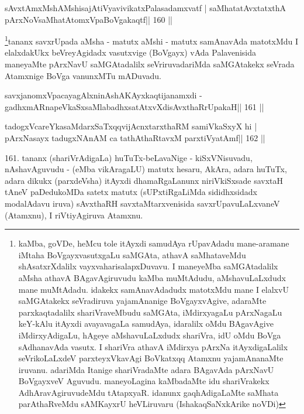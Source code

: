 
\begin{shl}
sAvxtAmxMshAMshisajAtiVyavivikatxPalasadamxvatf |
saMhatatAvxtatxthA pArxNoV\s saMhatAtomxVpaBoVgakaqtf\hfill || 160 ||
\end{shl}

\begin{artha}
\footnote{kaMba, goVDe, heMcu tole itAyxdi samudAya rUpavAdadu 
mane-aramane iMtaha BoVgayxvasutxgaLu saMGAta, athavA saMhataveMdu 
shAsatxrXdalilx vayxvaharisalapxDuvavu. I maneyeMba saMGAtadalilx aMsha 
athavA BAgavAgiruvudu kaMba muMtAdudu, aMshavuLaLxdudx mane muMtAdadu. 
idakekx samAnavAdadudx matotxMdu mane I elalxvU saMGAtakekx seVradiruva 
yajamAnanige BoVgayxvAgive, adaraMte parxkaqtadalilx shariVraveMbudu 
saMGAta, iMdirxyagaLu pArxNagaLu keY-kAlu itAyxdi avayavagaLa samudAya, 
idaralilx oMdu BAgavAgive iMdirxyAdigaLu, hAgeye aMshavuLaLxdudx 
shariVra, idU oMdu BoVga sAdhanavAda vasutx. I shariVra athavA iMdirxya 
pArxNa itAyxdigaLalilx seVrikoLaLxdeV parxteyxVkavAgi BoVkatxqq Atamxnu yajamAnanaMte iruvanu. adariMda Itanige shariVradaMte adara BAgavAda pArxNavU BoVgayxveV Aguvudu. maneyoLagina kaMbadaMte idu shariVrakekx AdhAravAgiruvudeMdu tAtapxyaR. idanunx gaqhAdigaLaMte saMhata parAthaRveMdu sAMKayxrU heVLiruvaru (IshakaqSaNxkArike noVDi)}tananx savxrUpada aMsha - matutx aMshi - matutx samAnavAda matotxMdu I elalxdakUkx beVreyAgidadx vasutxvige (BoVgayx) vAda Palavenisida maneyaMte pArxNavU saMGAtadalilx seVriruvadariMda saMGAtakekx seVrada Atamxnige BoVga	vanunxMTu mADuvadu.
\end{artha}


\begin{shl}
savxjanomxVpacayagAlxninAshAKAyxkaqtijanamxdi -
gadhxmARnapeVkaSxsaMlabadhxsatAtxvXdisAvxthaRrUpakaH\hfill || 161 ||
\end{shl}

\begin{shl}
tadogxVcareYkasaMdarxSaTxqqvijAcnxtarxthaRM samiVkaSxyX hi |
pArxNasayx tadugxNAnAM ca tathAthaRtavxM parxtiVyatAmf\hfill || 162 ||
\end{shl}

\begin{artha}
161. tananx (shariVrAdigaLa) huTuTx-beLavaNige - kiSxVNisuvadu,  nAshavAguvudu - (eMba vikAragaLU) matutx hesaru, AkAra, adara huTuTx, adara dikukx (parxdeVsha) itAyxdi dhamaRgaLanunx niriVkiSxsade savxtaH tAneV paDedukoMDa satetx  matutx (sUPxtiRgaLiMda sididhxsidadx modalAdavu iruva) sAvxthaRH savxtaMtarxvenisida savxrUpavuLaLxvaneV (Atamxnu), I riVtiyAgiruva Atamxnu.
\end{artha}

